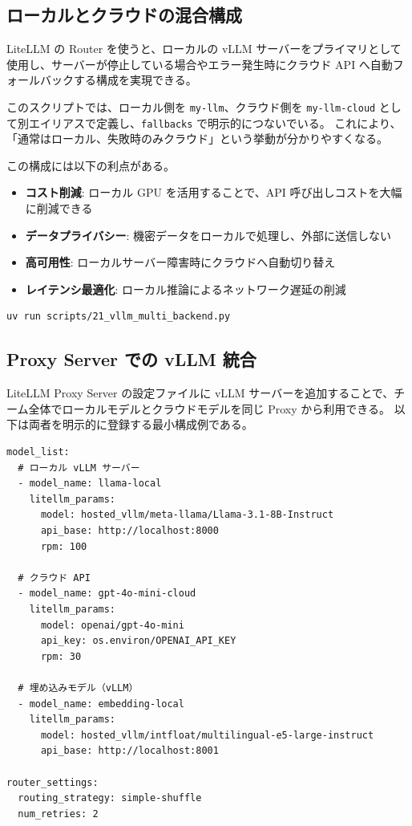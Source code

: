 \documentclass[a4paper,11pt]{ltjsarticle}
\newcommand{\code}[1]{\texttt{#1}}
\begin{document}
\subsection{ローカルとクラウドの混合構成}
\label{subsec:vllm_multi_backend}

LiteLLM の Router を使うと、ローカルの vLLM サーバーをプライマリとして使用し、サーバーが停止している場合やエラー発生時にクラウド API へ自動フォールバックする構成を実現できる。



このスクリプトでは、ローカル側を \code{my-llm}、クラウド側を \code{my-llm-cloud} として別エイリアスで定義し、\code{fallbacks} で明示的につないでいる。
これにより、「通常はローカル、失敗時のみクラウド」という挙動が分かりやすくなる。

この構成には以下の利点がある。

\begin{itemize}
  \item \textbf{コスト削減}: ローカル GPU を活用することで、API 呼び出しコストを大幅に削減できる
  \item \textbf{データプライバシー}: 機密データをローカルで処理し、外部に送信しない
  \item \textbf{高可用性}: ローカルサーバー障害時にクラウドへ自動切り替え
  \item \textbf{レイテンシ最適化}: ローカル推論によるネットワーク遅延の削減
\end{itemize}

\begin{lstlisting}[style=bash]
uv run scripts/21_vllm_multi_backend.py
\end{lstlisting}

\subsection{Proxy Server での vLLM 統合}

LiteLLM Proxy Server の設定ファイルに vLLM サーバーを追加することで、チーム全体でローカルモデルとクラウドモデルを同じ Proxy から利用できる。
以下は両者を明示的に登録する最小構成例である。

\begin{lstlisting}[style=python, caption={vLLM を含む Proxy Server 設定（\code{config.yaml}）}]
model_list:
  # ローカル vLLM サーバー
  - model_name: llama-local
    litellm_params:
      model: hosted_vllm/meta-llama/Llama-3.1-8B-Instruct
      api_base: http://localhost:8000
      rpm: 100

  # クラウド API
  - model_name: gpt-4o-mini-cloud
    litellm_params:
      model: openai/gpt-4o-mini
      api_key: os.environ/OPENAI_API_KEY
      rpm: 30

  # 埋め込みモデル（vLLM）
  - model_name: embedding-local
    litellm_params:
      model: hosted_vllm/intfloat/multilingual-e5-large-instruct
      api_base: http://localhost:8001

router_settings:
  routing_strategy: simple-shuffle
  num_retries: 2
\end{lstlisting}
\end{document}
